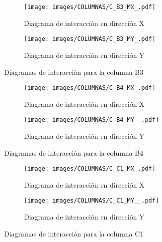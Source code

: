 
\begin{figure}[H]
     \centering
     \begin{subfigure}[b]{0.45\textwidth}
         \centering
         \texttt{[image: images/COLUMNAS/C\_B3\_MX\_.pdf]}
         \caption{Diagrama de interacción en dirección X}
         \label{fig:CB3 X}
     \end{subfigure}
     \hfill
     \begin{subfigure}[b]{0.45\textwidth}
         \centering
         \texttt{[image: images/COLUMNAS/C\_B3\_MY\_.pdf]}
         \caption{Diagrama de interacción en dirección Y}
         \label{fig:CB3 Y}
     \end{subfigure}
    
        \caption{Diagramas de interacción para la columna B3}
        \label{fig:B3}
\end{figure}


\begin{figure}[H]
     \centering
     \begin{subfigure}[b]{0.45\textwidth}
         \centering
         \texttt{[image: images/COLUMNAS/C\_B4\_MX\_.pdf]}
         \caption{Diagrama de interacción en dirección X}
         \label{fig:CB4 X}
     \end{subfigure}
     \hfill
     \begin{subfigure}[b]{0.45\textwidth}
         \centering
         \texttt{[image: images/COLUMNAS/C\_B4\_MY\_\_.pdf]}
         \caption{Diagrama de interacción en dirección Y}
         \label{fig:CB4 Y}
     \end{subfigure}
    
        \caption{Diagramas de interacción para la columna B4}
        \label{fig:B4}
\end{figure}


\begin{figure}[H]
     \centering
     \begin{subfigure}[b]{0.45\textwidth}
         \centering
         \texttt{[image: images/COLUMNAS/C\_C1\_MX\_.pdf]}
         \caption{Diagrama de interacción en dirección X}
         \label{fig:CC1 X}
     \end{subfigure}
     \hfill
     \begin{subfigure}[b]{0.45\textwidth}
         \centering
         \texttt{[image: images/COLUMNAS/C\_C1\_MY\_\_.pdf]}
         \caption{Diagrama de interacción en dirección Y}
         \label{fig:CC1 Y}
     \end{subfigure}
    
        \caption{Diagramas de interacción para la columna C1}
        \label{fig:C1}
\end{figure}

